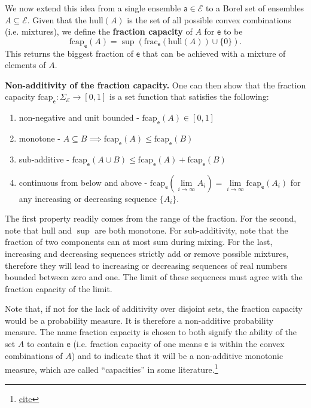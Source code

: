 \documentclass[10pt,twocolumn, nofootinbib]{revtex4-2}
\newcommand\hull{\mathrm{hull}}
\newcommand\fraction{\mathrm{frac}}
\newcommand\frcap{\mathrm{fcap}}
\newcommand{\ens}[1][e] {\mathsf{#1}} %
\newcommand{\Ens}[1][E] {\mathcal{#1}} %
\begin{document}
We now extend this idea from a single ensemble $\ens[a] \in \Ens$ to a Borel set of ensembles $A \subseteq \Ens$. Given that the $\hull(A)$ is the set of all possible convex combinations (i.e. mixtures), we define the \textbf{fraction capacity} of $A$ for $\ens$ to be
\begin{equation}
	\frcap_{\ens}(A) = \sup(\fraction_{\ens}(\hull(A))\cup\{0\}).
\end{equation}
This returns the biggest fraction of $\ens$ that can be achieved with a mixture of elements of $A$.

\textbf{Non-additivity of the fraction capacity.} One can then show that the fraction capacity $\frcap_{\ens} : \Sigma_{\Ens} \to [0,1]$ is a set function that satisfies the following:
\begin{enumerate}
	\item non-negative and unit bounded - $\frcap_{\ens}(A) \in [0,1]$
	\item monotone - $A \subseteq B \implies \frcap_{\ens}(A) \leq \frcap_{\ens}(B)$
	\item sub-additive - $\frcap_{\ens}(A \cup B) \leq \frcap_{\ens}(A) + \frcap_{\ens}(B)$
	\item continuous from below and above - $\frcap_{\ens}(\lim\limits_{i \to \infty} A_i) = \lim\limits_{i \to \infty} \frcap_{\ens}(A_i)$ for any increasing or decreasing sequence $\{A_i\}$.
\end{enumerate}

The first property readily comes from the range of the fraction. For the second, note that $\hull$ and $\sup$ are both monotone. For sub-additivity, note that the fraction of two components can at most sum during mixing. For the last, increasing and decreasing sequences strictly add or remove possible mixtures, therefore they will lead to increasing or decreasing sequences of real numbers bounded between zero and one. The limit of these sequences must agree with the fraction capacity of the limit.

Note that, if not for the lack of additivity over disjoint sets, the fraction capacity would be a probability measure. It is therefore a non-additive probability measure. The name fraction capacity is chosen to both signify the ability of the set $A$ to contain $\ens$ (i.e. fraction capacity of one means $\ens$ is within the convex combinations of $A$) and to indicate that it will be a non-additive monotonic measure, which are called ``capacities'' in some literature.\footnote{ \href{ https://link.springer.com/book/10.1007/978-3-319-03155-2}{cite} }
\end{document}
